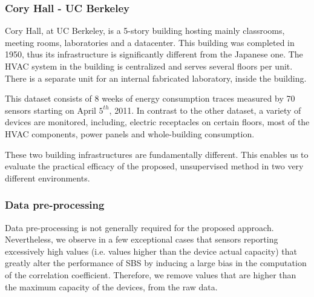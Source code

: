
\subsubsection{Cory Hall - UC Berkeley}
Cory Hall, at UC Berkeley, is a 5-story building hosting mainly classrooms, meeting rooms, laboratories and a datacenter.
This building was completed in 1950, thus its infrastructure is significantly different from the Japanese one.
The HVAC system in the building is centralized and serves several floors per unit.
There is a separate unit for an internal fabricated laboratory, inside the building.

This dataset consists of 8 weeks of energy consumption traces measured by 70 sensors starting on April $5^{th}$, 2011.
In contrast to the other dataset, a variety of devices are monitored, including, electric receptacles on certain floors, most of the HVAC components, 
 power panels and whole-building consumption.

These two building infrastructures are fundamentally different.  
This enables us to evaluate the practical efficacy of the proposed, unsupervised method in two very different environments.


\subsubsection{Data pre-processing}
Data pre-processing is not generally required for the proposed approach.  
Nevertheless, we observe in a few exceptional cases that sensors reporting excessively high values (i.e. values higher than the device actual capacity) that  greatly alter the performance of SBS by inducing a large bias in the computation of the correlation coefficient.
Therefore, we remove values that are higher than the maximum capacity of the devices, from the raw data.


